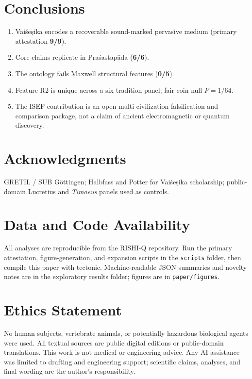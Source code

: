 \documentclass[12pt]{article}
\newcommand{\Vais}{Vaiśeṣika}
\newcommand{\Pras}{Praśastapāda}
\begin{document}
\section{Conclusions}
\begin{enumerate}
\item \Vais{} encodes a recoverable sound-marked pervasive medium (primary attestation \textbf{9/9}).
\item Core claims replicate in \Pras{} (\textbf{6/6}).
\item The ontology fails Maxwell structural features (\textbf{0/5}).
\item Feature R2 is unique across a six-tradition panel; fair-coin null $P=1/64$.
\item The ISEF contribution is an open multi-civilization falsification-and-comparison package, not a claim of ancient electromagnetic or quantum discovery.
\end{enumerate}

\section*{Acknowledgments}
GRETIL / SUB Göttingen; Halbfass and Potter for \Vais{} scholarship; public-domain Lucretius and \emph{Timaeus} panels used as controls.

\section*{Data and Code Availability}
\noindent
All analyses are reproducible from the RISHI-Q repository.
Run the primary attestation, figure-generation, and expansion scripts in the \texttt{scripts} folder, then compile this paper with tectonic.
Machine-readable JSON summaries and novelty notes are in the exploratory results folder; figures are in \texttt{paper/figures}.

\section*{Ethics Statement}
No human subjects, vertebrate animals, or potentially hazardous biological agents were used.
All textual sources are public digital editions or public-domain translations.
This work is not medical or engineering advice.
Any AI assistance was limited to drafting and engineering support; scientific claims, analyses, and final wording are the author's responsibility.
\end{document}
